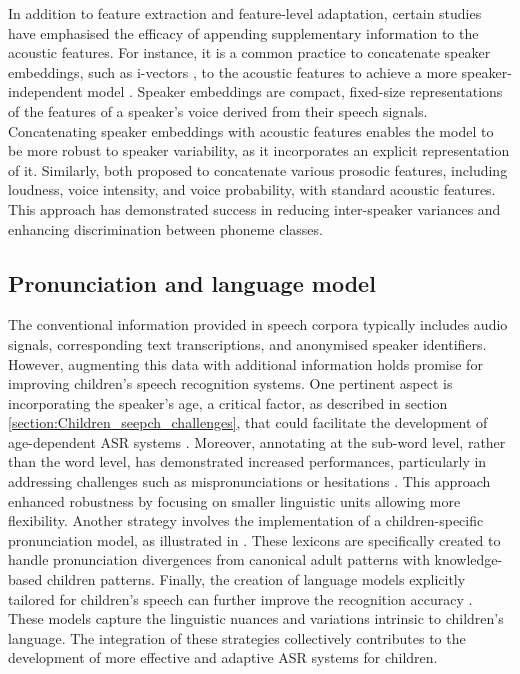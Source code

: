 In addition to feature extraction and feature-level adaptation, certain studies have emphasised the efficacy of appending supplementary information to the acoustic features. For instance, it is a common practice to concatenate speaker embeddings, such as i-vectors \cite{ivector}, to the acoustic features to achieve a more speaker-independent model \cite{shivakumar2020transfer}. Speaker embeddings are compact, fixed-size representations of the features of a speaker's voice derived from their speech signals. Concatenating speaker embeddings with acoustic features enables the model to be more robust to speaker variability, as it incorporates an explicit representation of it. Similarly, both \cite{prosody_feat,kadyan2023prosody} proposed to concatenate various prosodic features, including loudness, voice intensity, and voice probability, with standard acoustic features. This approach has demonstrated success in reducing inter-speaker variances and enhancing discrimination between phoneme classes.


\subsection{Pronunciation and language model}
The conventional information provided in speech corpora typically includes audio signals, corresponding text transcriptions, and anonymised speaker identifiers. However, augmenting this data with additional information holds promise for improving children's speech recognition systems. One pertinent aspect is incorporating the speaker's age, a critical factor, as described in section \ref{section:Children_seepch_challenges}, that could facilitate the development of age-dependent \ac{ASR} systems \cite{linguistic-children, gale2019improving}. 
Moreover, annotating at the sub-word level, rather than the word level, has demonstrated increased performances, particularly in addressing challenges such as mispronunciations or hesitations \cite{subwords}. This approach enhanced robustness by focusing on smaller linguistic units allowing more flexibility. Another strategy involves the implementation of a children-specific pronunciation model, as illustrated in \cite{pronunciation,pronunciation2}. These lexicons are specifically created to handle pronunciation divergences from canonical adult patterns with knowledge-based children patterns.
Finally, the creation of language models explicitly tailored for children's speech can further improve the recognition accuracy \cite{children_language_model2,Children_language_model}. These models capture the linguistic nuances and variations intrinsic to children's language. The integration of these strategies collectively contributes to the development of more effective and adaptive \ac{ASR} systems for children.

